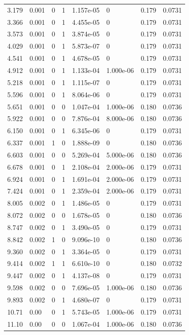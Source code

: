 \documentclass[preview]{standalone}
\begin{document}
{{\begin{tabular}{L{1.2cm}C{1.2cm} C{0.3cm}C{0.5cm} C{1.4cm}C{1.4cm} C{1.4cm}C{1.4cm}}
  3.179  &  0.001  & 0     &  1 &  1.157e-05  & 0  & 0.179 &  0.0731   \\ 
  3.366  &  0.001  & 0     &  1 &  4.455e-05  & 0  & 0.179 &  0.0731   \\ 
  3.573  &  0.001  & 0     &  1 &  3.874e-05  & 0  & 0.179 &  0.0731   \\ 
  4.029  &  0.001  & 0     &  1 &  5.873e-07  & 0  & 0.179 &  0.0731   \\ 
  4.541  &  0.001  & 0     &  1 &  4.678e-05  & 0  & 0.179 &  0.0731   \\ 
  4.912  &  0.001  & 0     &  1 &  1.133e-04  & 1.000e-06  & 0.179 &  0.0731   \\ 
  5.218  &  0.001  & 0     &  1 &  1.115e-07  & 0  & 0.179 &  0.0731   \\ 
  5.596  &  0.001  & 0     &  1 &  8.064e-06  & 0  & 0.179 &  0.0731   \\ 
  5.651  &  0.001  & 0     &  0 &  1.047e-04  & 1.000e-06  & 0.180 &  0.0736   \\ 
  5.922  &  0.001  & 0     &  0 &  7.876e-04  & 8.000e-06  & 0.180 &  0.0736   \\ 
  6.150  &  0.001  & 0     &  1 &  6.345e-06  & 0  & 0.179 &  0.0731   \\ 
  6.337  &  0.001  & 1     &  0 &  1.888e-09  & 0  & 0.180 &  0.0736   \\ 
  6.603  &  0.001  & 0     &  0 &  5.269e-04  & 5.000e-06  & 0.180 &  0.0736   \\ 
  6.678  &  0.001  & 0     &  1 &  2.108e-04  & 2.000e-06  & 0.179 &  0.0731   \\ 
  6.924  &  0.001  & 0     &  1 &  1.691e-04  & 2.000e-06  & 0.179 &  0.0731   \\ 
  7.424  &  0.001  & 0     &  1 &  2.359e-04  & 2.000e-06  & 0.179 &  0.0731   \\ 
  8.005  &  0.002  & 0     &  1 &  1.486e-05  & 0  & 0.179 &  0.0731   \\ 
  8.072  &  0.002  & 0     &  0 &  1.678e-05  & 0  & 0.180 &  0.0736   \\ 
  8.747  &  0.002  & 0     &  1 &  3.490e-05  & 0  & 0.179 &  0.0731   \\ 
  8.842  &  0.002  & 1     &  0 &  9.096e-10  & 0  & 0.180 &  0.0736   \\ 
  9.360  &  0.002  & 0     &  1 &  3.364e-05  & 0  & 0.179 &  0.0731   \\ 
  9.414  &  0.002  & 1     &  1 &  6.610e-10  & 0  & 0.180 &  0.0732   \\ 
  9.447  &  0.002  & 0     &  1 &  4.137e-08  & 0  & 0.179 &  0.0731   \\ 
  9.598  &  0.002  & 0     &  0 &  7.696e-05  & 1.000e-06  & 0.180 &  0.0736   \\ 
  9.893  &  0.002  & 0     &  1 &  4.680e-07  & 0  & 0.179 &  0.0731   \\ 
  10.71  &  0.00  & 0     &  1 &  5.743e-05  & 1.000e-06  & 0.179 &  0.0731   \\ 
  11.10  &  0.00  & 0     &  0 &  1.067e-04  & 1.000e-06  & 0.180 &  0.0736   \\ 
\hline 
\end{tabular} 

}}
\end{document}
